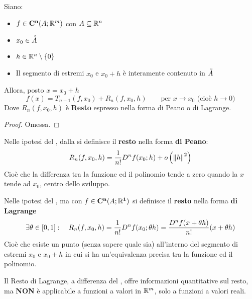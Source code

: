 \begin{theorem}[di Taylor]
	\label{teo:taylor}
	Siano:
	\begin{itemize}[noitemsep]
		\item $f \in \mathbf{C^{n}}(A;\mathbb{R}^m)$ con $A \subseteq \mathbb{R}^n$
		\item $x_0 \in \accentset{\circ}{A}$
		\item $h \in \mathbb{R}^n \setminus \left\{0\right\}$
		\item Il segmento di estremi $x_0$ e $x_0 + h$ è interamente contenuto in $\accentset{\circ}{A}$
	\end{itemize}
	Allora, posto $x = x_0 + h$
	\[f(x) = T_{n-1}(f, x_0) + R_n(f, x_0, h) \qquad \text{per } x \to x_0 \text{ (cioè } h \to 0\text{)}\]
	Dove $R_n(f, x_0, h)$ è \textbf{Resto} espresso nella forma di Peano o di Lagrange.
	\begin{proof}
		Omessa.
	\end{proof}
\end{theorem}

\begin{definition}
	\label{def:resto_peano}
	Nelle ipotesi del , dalla  si definisce il \textbf{resto} nella forma \textbf{di Peano}:
	\[R_n(f, x_0, h) = \frac{1}{n!} D^nf(x_0; h) + o\left( \left\|h\right\|^2 \right)\]
	Cioè che la differenza tra la funzione ed il polinomio tende a zero quando la $x$ tende ad $x_0$, centro dello sviluppo.
\end{definition}

\begin{definition}
	Nelle ipotesi del , ma con $f \in \mathbf{C^{n}}(A;\mathbb{R}^{\boldsymbol{1}})$ si definisce il \textbf{resto} nella forma \textbf{di Lagrange}
	\[\exists \theta \in \left[0,1\right]: \quad R_n(f, x_0, h) = \frac{1}{n!} D^nf(x_0; \theta h) = \frac{D^n f(x + \theta h)}{n!} (x + \theta h)\]
	Cioè che esiste un punto (senza sapere quale sia) all'interno del segmento di estremi $x_0$ e $x_0 + h$ in cui si ha un'equivalenza precisa tra la funzione ed il polinomio.
\end{definition}
\begin{observation}
	\label{obs:resto_lagr_Rn}
	Il Resto di Lagrange, a differenza del , offre informazioni quantitative sul resto, ma \textbf{NON} è applicabile a funzioni a valori in $\mathbb{R}^m$, solo a funzioni a valori reali.
\end{observation}
\cbend

